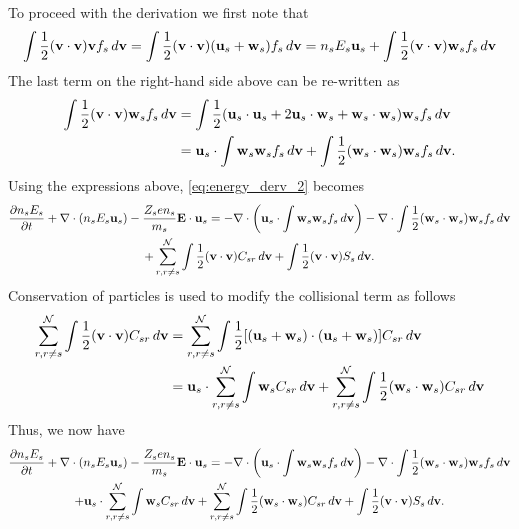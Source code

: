\documentclass[a4paper,11pt]{report}
\begin{document}
To proceed with the derivation we first note that
\begin{multline}
\int \frac{1}{2} (\mathbf{v} \cdot \mathbf{v}) \mathbf{v} f_s \, d\mathbf{v} = \int \frac{1}{2} (\mathbf{v} \cdot \mathbf{v}) (\mathbf{u}_s + \mathbf{w}_s) f_s \, d\mathbf{v} = n_s E_s \mathbf{u}_s + \int \frac{1}{2} (\mathbf{v} \cdot \mathbf{v} ) \mathbf{w}_s f_s \, d\mathbf{v}
\end{multline}
The last term on the right-hand side above can be re-written as
\begin{align}
\int \frac{1}{2} ( \mathbf{v} \cdot \mathbf{v} ) \mathbf{w}_s f_s \, d\mathbf{v} &= \int \frac{1}{2} ( \mathbf{u}_s \cdot \mathbf{u}_s + 2\mathbf{u}_s \cdot \mathbf{w}_s + \mathbf{w}_s \cdot \mathbf{w}_s ) \mathbf{w}_s f_s \, d\mathbf{v} \\
& =  \mathbf{u}_s \cdot \int \mathbf{w}_s \mathbf{w}_s f_s \, d\mathbf{v} + \int \frac{1}{2} ( \mathbf{w}_s \cdot \mathbf{w}_s ) \mathbf{w}_s f_s \, d\mathbf{v}.
\end{align}
Using the expressions above, \cref{eq:energy_derv_2} becomes
\begin{multline}
\label{eq:energy_derv_3}
\frac{\partial n_s E_s}{\partial t} + \nabla \cdot (n_s E_s \mathbf{u}_s ) - \frac{Z_s e n_s}{m_s} \mathbf{E} \cdot \mathbf{u}_s =  - \nabla \cdot \left ( \mathbf{u}_s \cdot \int \mathbf{w}_s \mathbf{w}_s f_s \, d\mathbf{v} \right ) - \nabla \cdot \int \frac{1}{2} ( \mathbf{w}_s \cdot \mathbf{w}_s ) \mathbf{w}_s f_s \, d\mathbf{v}\\
+ \sum_{r, r \ne s}^\mathcal{N} \int \frac{1}{2} (\mathbf{v} \cdot \mathbf{v}) C_{s r} \, d\mathbf{v} + \int \frac{1}{2} (\mathbf{v} \cdot \mathbf{v}) S_s \, d\mathbf{v}.
\end{multline}
Conservation of particles is used to modify the collisional term as follows
\begin{align}
    \label{eq:energy_collision_expansion}
    \sum_{r,r \ne s}^\mathcal{N} \int \frac{1}{2} (\mathbf{v} \cdot \mathbf{v}) C_{s r} \, d\mathbf{v} 
    &= \sum_{r,r \ne s}^\mathcal{N} \int \frac{1}{2} [ (\mathbf{u}_s + \mathbf{w}_s) \cdot (\mathbf{u}_s + \mathbf{w}_s)] C_{s r} \, d\mathbf{v} \nonumber \\
    &= \mathbf{u}_s \cdot  \sum_{r,r \ne s}^\mathcal{N} \int \mathbf{w}_s C_{s r} \, d\mathbf{v} + \sum_{r,r \ne s}^\mathcal{N} \int \frac{1}{2} (\mathbf{w}_s \cdot \mathbf{w}_s) C_{s r} \, d\mathbf{v} 
\end{align}
Thus, we now have
\begin{multline}
\label{eq:energy_derv_4}
\frac{\partial n_s E_s}{\partial t} + \nabla \cdot (n_s E_s \mathbf{u}_s ) - \frac{Z_s e n_s}{m_s} \mathbf{E} \cdot \mathbf{u}_s = - \nabla \cdot \left ( \mathbf{u}_s \cdot \int \mathbf{w}_s \mathbf{w}_s f_s \, d\mathbf{v}  \right ) - \nabla \cdot \int \frac{1}{2} ( \mathbf{w}_s \cdot \mathbf{w}_s ) \mathbf{w}_s f_s \, d\mathbf{v} \\
+ \mathbf{u}_s \cdot \sum_{r,r \ne s}^\mathcal{N} \int \mathbf{w}_s C_{s r} \, d\mathbf{v} + \sum_{r, r \ne s}^\mathcal{N} \int \frac{1}{2} (\mathbf{w}_s \cdot \mathbf{w}_s) C_{s r} \, d\mathbf{v} + \int \frac{1}{2} (\mathbf{v} \cdot \mathbf{v}) S_s \, d\mathbf{v}.
\end{multline}
\end{document}
